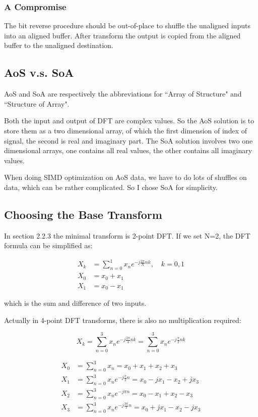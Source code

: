 \documentclass[a4paper]{report}
\begin{document}
\subsubsection{A Compromise} \indent

	The bit reverse procedure should be out-of-place to shuffle the unaligned inputs into an aligned buffer. After transform the output is copied from the aligned buffer to the unaligned destination.

\subsection{AoS v.s. SoA} \indent

	AoS and SoA are respectively the abbreviations for ``Array of Structure" and ``Structure of Array".
	
	Both the input and output of DFT are complex values. So the AoS solution is to store them as a two dimensional array, of which the first dimension of index of signal, the second is real and imaginary part. The SoA solution involves two one dimensional arrays, one contains all real values, the other contains all imaginary values.

	When doing SIMD optimization on AoS data, we have to do lots of shuffles on data, which can be rather complicated. So I chose SoA for simplicity.
	
\subsection{Choosing the Base Transform} \indent

	In section 2.2.3 the minimal transform is 2-point DFT. If we set N=2, the DFT formula can be simplified as:

\begin{align*}
	X_k &= \sum^{1}_{n=0} x_n e^{-j\frac{2\pi}{N}nk}, \quad k = 0, 1 \\
	X_0 &= x_0 + x_1 \\
	X_1 &= x_0 - x_1
\end{align*}

	which is the sum and difference of two inputs.
	
	\bigskip
	
	Actually in 4-point DFT transforms, there is also no multiplication required:

\[X_k = \sum_{n=0}^{3} x_n e^{-j\frac{2\pi}{4}nk} = \sum_{n=0}^{3} x_n e^{-j\frac{\pi}{2}nk} \]

\begin{align*}
X_0 &= \sum_{n=0}^{3} x_n = x_0 + x_1 + x_2 + x_3 \\
X_1 &= \sum_{n=0}^{3} x_n e^{-j\frac{\pi}{2}n} = x_0 - jx_1 - x_2 + jx_3 \\
X_2 &= \sum_{n=0}^{3} x_n e^{-j\pi n} = x_0 - x_1 + x_2 - x_3 \\
X_3 &= \sum_{n=0}^{3} x_n e^{-j\frac{3\pi}{2} n} = x_0 + jx_1 - x_2 - jx_3
\end{align*}
\end{document}
